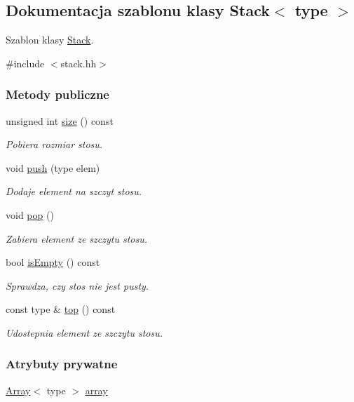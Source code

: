 \hypertarget{class_stack}{\subsection{Dokumentacja szablonu klasy Stack$<$ type $>$}
\label{class_stack}
}


Szablon klasy \hyperlink{class_stack}{Stack}.  




{\ttfamily \#include $<$stack.\-hh$>$}

\subsubsection*{Metody publiczne}
\begin{DoxyCompactItemize}
\item 
unsigned int \hyperlink{class_stack_a80fe1d90b284500ae0f9f6887ba5499d}{size} () const 
\begin{DoxyCompactList}\small\item\em Pobiera rozmiar stosu. \end{DoxyCompactList}\item 
void \hyperlink{class_stack_a12cd3afaa512ef23598abdab1fa13adc}{push} (type elem)
\begin{DoxyCompactList}\small\item\em Dodaje element na szczyt stosu. \end{DoxyCompactList}\item 
void \hyperlink{class_stack_a7d66b2f030b693dffaf921e09a8a2088}{pop} ()
\begin{DoxyCompactList}\small\item\em Zabiera element ze szczytu stosu. \end{DoxyCompactList}\item 
bool \hyperlink{class_stack_a5f3c3c7c32ce4466250de45d3661eade}{is\-Empty} () const 
\begin{DoxyCompactList}\small\item\em Sprawdza, czy stos nie jest pusty. \end{DoxyCompactList}\item 
const type \& \hyperlink{class_stack_a9024a402fb2c78f0ef08b1bee95c2b0c}{top} () const 
\begin{DoxyCompactList}\small\item\em Udostepnia element ze szczytu stosu. \end{DoxyCompactList}\end{DoxyCompactItemize}
\subsubsection*{Atrybuty prywatne}
\begin{DoxyCompactItemize}
\item 
\hyperlink{class_array}{Array}$<$ type $>$ \hyperlink{class_stack_ae391f10eeb7e30406357caf95b0f2534}{array}
\end{DoxyCompactItemize}


